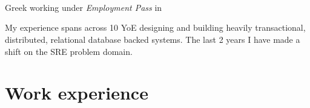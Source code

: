 \documentclass{CVSoftwareEngineer}
\begin{document}
	\section{\textbf{\cvname}}
	\begin{center}
		\href{mailto:\cvmail}{\cvmail} \space \textbar \space \cvlinkedin \space \textbar \space \cvgithub \\
		Greek working under \textit{Employment Pass} in \cvaddress
	\end{center}
	My experience spans across 10 YoE designing and building heavily transactional, distributed,
	relational database backed systems. The last 2 years I have made a shift on the SRE problem domain.

	\section{Work experience}
\end{document}
